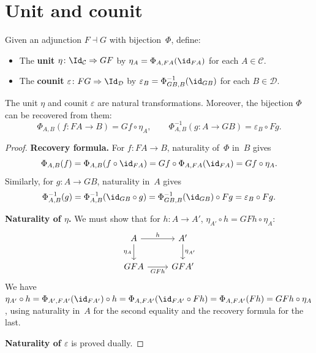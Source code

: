 \section{Unit and counit}\label{sec:unit-counit}

\begin{definition}\label{def:unit-counit}
Given an adjunction $F\dashv G$ with bijection~$\Phi$, define:
\begin{itemize}
\item The \textbf{unit} $\eta\colon \Id_{\mathcal{C}}\Rightarrow GF$
    by $\eta_A = \Phi_{A,FA}(\id_{FA})$ for each $A\in\mathcal{C}$.
\item The \textbf{counit} $\varepsilon\colon FG\Rightarrow\Id_{\mathcal{D}}$
    by $\varepsilon_B = \Phi^{-1}_{GB,B}(\id_{GB})$ for each
    $B\in\mathcal{D}$.
\end{itemize}
\end{definition}

\begin{proposition}\label{prop:unit-counit-nat}
The unit $\eta$ and counit $\varepsilon$ are natural transformations.
Moreover, the bijection $\Phi$ can be recovered from them:
\[
    \Phi_{A,B}(f\colon FA\to B) = Gf\circ\eta_A,
    \qquad
    \Phi^{-1}_{A,B}(g\colon A\to GB) = \varepsilon_B\circ Fg.
\]
\end{proposition}

\begin{proof}
\textbf{Recovery formula.}
For $f\colon FA\to B$, naturality of~$\Phi$ in~$B$ gives
\[
    \Phi_{A,B}(f) = \Phi_{A,B}(f\circ\id_{FA})
    = Gf\circ\Phi_{A,FA}(\id_{FA}) = Gf\circ\eta_A.
\]
Similarly, for $g\colon A\to GB$, naturality in~$A$ gives
\[
    \Phi^{-1}_{A,B}(g)
    = \Phi^{-1}_{A,B}(\id_{GB}\circ g)
    = \Phi^{-1}_{GB,B}(\id_{GB})\circ Fg
    = \varepsilon_B\circ Fg.
\]

\textbf{Naturality of $\eta$.}
We must show that for $h\colon A\to A'$, $\eta_{A'}\circ h = GFh\circ\eta_A$:
\[
\begin{tikzcd}
A \arrow[r, "h"] \arrow[d, "\eta_A"'] & A' \arrow[d, "\eta_{A'}"] \\
GFA \arrow[r, "GFh"'] & GFA'
\end{tikzcd}
\]
We have $\eta_{A'}\circ h = \Phi_{A',FA'}(\id_{FA'})\circ h
= \Phi_{A,FA'}(\id_{FA'}\circ Fh) = \Phi_{A,FA'}(Fh)
= GFh\circ\eta_A$, using naturality in~$A$ for the second
equality and the recovery formula for the last.

\textbf{Naturality of $\varepsilon$} is proved dually.
\end{proof}


